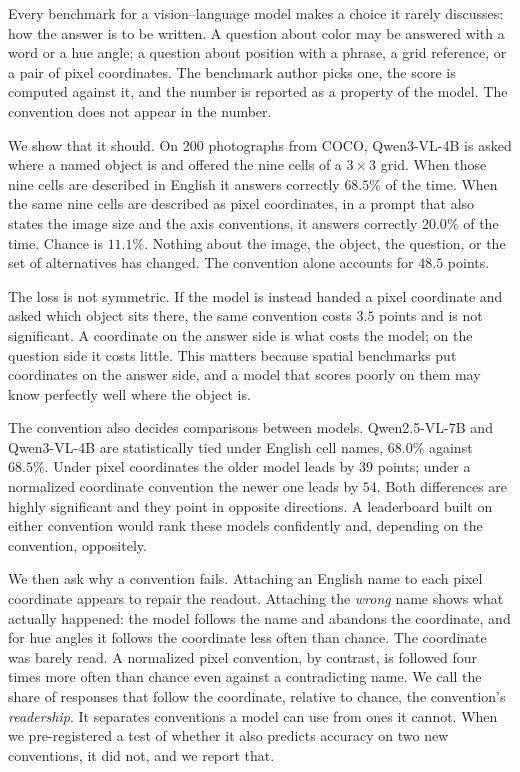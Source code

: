 \documentclass{article}
\begin{document}
Every benchmark for a vision--language model makes a choice it rarely discusses:
how the answer is to be written. A question about color may be answered with a
word or a hue angle; a question about position with a phrase, a grid reference, or
a pair of pixel coordinates. The benchmark author picks one, the score is computed
against it, and the number is reported as a property of the model. The convention
does not appear in the number.

We show that it should. On 200 photographs from COCO, Qwen3-VL-4B is asked where a
named object is and offered the nine cells of a $3\times3$ grid. When those nine
cells are described in English it answers correctly $68.5\%$ of the time. When the
same nine cells are described as pixel coordinates, in a prompt that also states
the image size and the axis conventions, it answers correctly $20.0\%$ of the time.
Chance is $11.1\%$. Nothing about the image, the object, the question, or the set
of alternatives has changed. The convention alone accounts for $48.5$ points.

The loss is not symmetric. If the model is instead handed a pixel coordinate and
asked which object sits there, the same convention costs $3.5$ points and is not
significant. A coordinate on the answer side is what costs the model; on the
question side it costs little. This matters because spatial benchmarks put
coordinates on the answer side, and a model that scores poorly on them may know
perfectly well where the object is.

The convention also decides comparisons between models. Qwen2.5-VL-7B and
Qwen3-VL-4B are statistically tied under English cell names, $68.0\%$ against
$68.5\%$. Under pixel coordinates the older model leads by $39$ points; under a
normalized coordinate convention the newer one leads by $54$. Both differences are
highly significant and they point in opposite directions. A leaderboard built on
either convention would rank these models confidently and, depending on the
convention, oppositely.

We then ask why a convention fails. Attaching an English name to each pixel
coordinate appears to repair the readout. Attaching the \emph{wrong} name shows
what actually happened: the model follows the name and abandons the coordinate,
and for hue angles it follows the coordinate less often than chance. The
coordinate was barely read. A normalized pixel convention, by contrast, is followed
four times more often than chance even against a contradicting name. We call the
share of responses that follow the coordinate, relative to chance, the
convention's \emph{readership}. It separates conventions a model can use from ones
it cannot. When we pre-registered a test of whether it also predicts accuracy on
two new conventions, it did not, and we report that.
\end{document}
